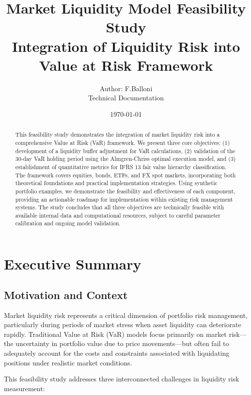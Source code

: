 \documentclass[11pt,a4paper]{article}
\title{\textbf{Market Liquidity Model Feasibility Study} \\
\large Integration of Liquidity Risk into Value at Risk Framework}
\author{Author: F.Balloni \\ Technical Documentation}
\date{\today}
\begin{document}
\maketitle

\begin{abstract}
This feasibility study demonstrates the integration of market liquidity risk into a comprehensive Value at Risk (VaR) framework. We present three core objectives: (1) development of a liquidity buffer adjustment for VaR calculations, (2) validation of the 30-day VaR holding period using the Almgren-Chriss optimal execution model, and (3) establishment of quantitative metrics for IFRS 13 fair value hierarchy classification. The framework covers equities, bonds, ETFs, and FX spot markets, incorporating both theoretical foundations and practical implementation strategies. Using synthetic portfolio examples, we demonstrate the feasibility and effectiveness of each component, providing an actionable roadmap for implementation within existing risk management systems. The study concludes that all three objectives are technically feasible with available internal data and computational resources, subject to careful parameter calibration and ongoing model validation.
\end{abstract}

\tableofcontents
\newpage

\section{Executive Summary}

\subsection{Motivation and Context}

Market liquidity risk represents a critical dimension of portfolio risk management, particularly during periods of market stress when asset liquidity can deteriorate rapidly. Traditional Value at Risk (VaR) models focus primarily on market risk—the uncertainty in portfolio value due to price movements—but often fail to adequately account for the costs and constraints associated with liquidating positions under realistic market conditions.

This feasibility study addresses three interconnected challenges in liquidity risk measurement:
\end{document}
